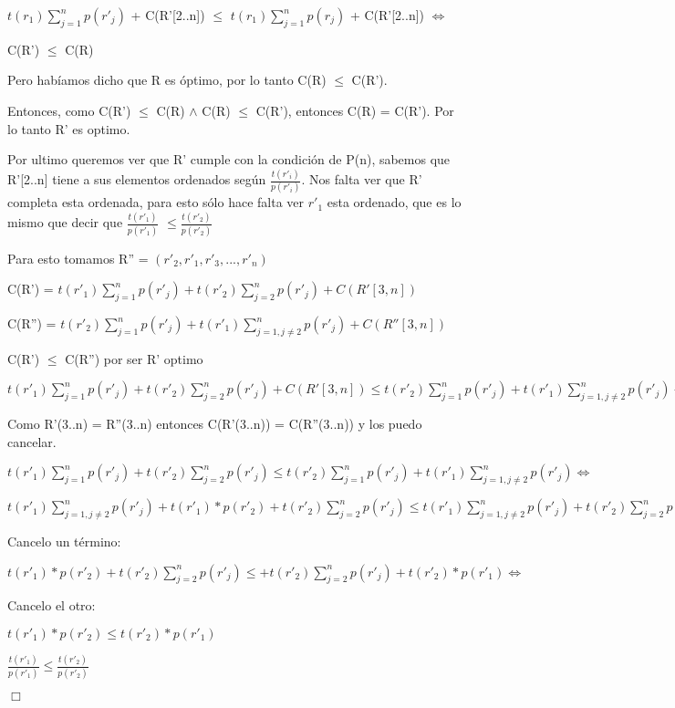 $t(r_1) \sum_{j=1}^{n}p(r'_j)$ + C(R'[2..n]) $\leq$  $t(r_1) \sum_{j=1}^{n}p(r_j)$ + C(R'[2..n]) $\iff$

C(R') $\leq$ C(R)

Pero habíamos dicho que R es óptimo, por lo tanto C(R) $\leq$ C(R').

Entonces, como C(R') $\leq$ C(R) $\wedge$ C(R) $\leq$ C(R'), entonces C(R) = C(R'). Por lo tanto R' es optimo.

Por ultimo queremos ver que R' cumple con la condición de P(n), sabemos que R'[2..n] tiene a sus elementos ordenados según $\frac{t(r'_i)}{p(r'_i)}$. Nos falta ver que R' completa esta ordenada, para esto sólo hace falta ver $r'_1$ esta ordenado, que es lo mismo que decir que $\frac{t(r'_1)}{p(r'_1)}$ $\leq \frac{t(r'_2)}{p(r'_2)}$

Para esto tomamos R'' = $(r'_2,r'_1,r'_3,...,r'_n)$

C(R') = $t(r'_1) \sum_{j=1}^{n}p(r'_j) + t(r'_2) \sum_{j=2}^{n}p(r'_j) + C(R'[3,n]) $

C(R'') = $t(r'_2) \sum_{j=1}^{n}p(r'_j) + t(r'_1) \sum_{j=1,j\neq 2}^{n}p(r'_j) + C(R''[3,n]) $

C(R') $\leq$ C(R'') por ser R' optimo

$t(r'_1) \sum_{j=1}^{n}p(r'_j) + t(r'_2) \sum_{j=2}^{n}p(r'_j) + C(R'[3,n]) \leq t(r'_2) \sum_{j=1}^{n}p(r'_j) + t(r'_1) \sum_{j=1,j\neq 2}^{n}p(r'_j) + C(R''[3,n]) \iff$

Como R'(3..n) = R''(3..n) entonces C(R'(3..n)) = C(R''(3..n)) y los puedo cancelar.

$t(r'_1) \sum_{j=1}^{n}p(r'_j) + t(r'_2) \sum_{j=2}^{n}p(r'_j)  \leq t(r'_2) \sum_{j=1}^{n}p(r'_j) + t(r'_1) \sum_{j=1,j\neq 2}^{n}p(r'_j)  \iff$

$t(r'_1) \sum_{j=1,j\neq 2}^{n}p(r'_j) + t(r'_1) * p(r'_2) + t(r'_2) \sum_{j=2}^{n}p(r'_j) \leq t(r'_1) \sum_{j=1,j\neq 2}^{n}p(r'_j) + t(r'_2) \sum_{j=2}^{n}p(r'_j)+ t(r'_2) * p(r'_1) \iff$  

Cancelo un término:

$t(r'_1) * p(r'_2) + t(r'_2) \sum_{j=2}^{n}p(r'_j) \leq + t(r'_2) \sum_{j=2}^{n}p(r'_j)+ t(r'_2) * p(r'_1) \iff$

Cancelo el otro:

$t(r'_1) * p(r'_2) \leq t(r'_2) * p(r'_1) $

$\frac{t(r'_1)}{p(r'_1)} \leq \frac{t(r'_2)}{p(r'_2)}$

\begin{flushright}
\hfill \ensuremath{\Box}
\end{flushright}



